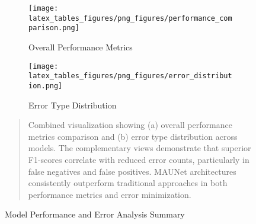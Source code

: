 \begin{figure}[htbp]
\centering
\begin{subfigure}[b]{0.48\textwidth}
    \texttt{[image: latex\_tables\_figures/png\_figures/performance\_comparison.png]}
    \caption{Overall Performance Metrics}
    \label{fig:performance_sub}
\end{subfigure}
\hfill
\begin{subfigure}[b]{0.48\textwidth}
    \texttt{[image: latex\_tables\_figures/png\_figures/error\_distribution.png]}
    \caption{Error Type Distribution}
    \label{fig:error_sub}
\end{subfigure}
\caption{Model Performance and Error Analysis Summary}
\label{fig:combined_analysis}
\begin{quote}
\small
Combined visualization showing (a) overall performance metrics comparison and (b) error type distribution across models. The complementary views demonstrate that superior F1-scores correlate with reduced error counts, particularly in false negatives and false positives. MAUNet architectures consistently outperform traditional approaches in both performance metrics and error minimization.
\end{quote}
\end{figure}
